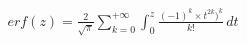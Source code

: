 \documentclass[preview]{standalone}
\begin{document}
\begin{align*}
erf(z) = { \frac{2}{\sqrt{\pi}} } \sum_{k=0}^{+\infty} \int_0^z { { \frac{(-1)^k \times t^{2k})^k}{k!} } } \, dt
\end{align*}
\end{document}
